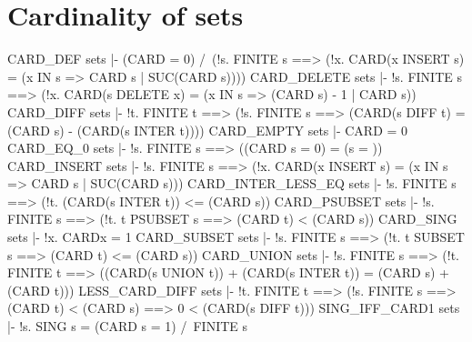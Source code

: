 \section{Cardinality of sets}
\THEOREM CARD\_DEF sets
|- (CARD{} = 0) /\
   (!s.
     FINITE s ==>
     (!x. CARD(x INSERT s) = (x IN s => CARD s | SUC(CARD s))))
\ENDTHEOREM
\THEOREM CARD\_DELETE sets
|- !s.
    FINITE s ==>
    (!x. CARD(s DELETE x) = (x IN s => (CARD s) - 1 | CARD s))
\ENDTHEOREM
\THEOREM CARD\_DIFF sets
|- !t.
    FINITE t ==>
    (!s. FINITE s ==> (CARD(s DIFF t) = (CARD s) - (CARD(s INTER t))))
\ENDTHEOREM
\THEOREM CARD\_EMPTY sets
|- CARD{} = 0
\ENDTHEOREM
\THEOREM CARD\_EQ\_0 sets
|- !s. FINITE s ==> ((CARD s = 0) = (s = {}))
\ENDTHEOREM
\THEOREM CARD\_INSERT sets
|- !s.
    FINITE s ==>
    (!x. CARD(x INSERT s) = (x IN s => CARD s | SUC(CARD s)))
\ENDTHEOREM
\THEOREM CARD\_INTER\_LESS\_EQ sets
|- !s. FINITE s ==> (!t. (CARD(s INTER t)) <= (CARD s))
\ENDTHEOREM
\THEOREM CARD\_PSUBSET sets
|- !s. FINITE s ==> (!t. t PSUBSET s ==> (CARD t) < (CARD s))
\ENDTHEOREM
\THEOREM CARD\_SING sets
|- !x. CARD{x} = 1
\ENDTHEOREM
\THEOREM CARD\_SUBSET sets
|- !s. FINITE s ==> (!t. t SUBSET s ==> (CARD t) <= (CARD s))
\ENDTHEOREM
\THEOREM CARD\_UNION sets
|- !s.
    FINITE s ==>
    (!t.
      FINITE t ==>
      ((CARD(s UNION t)) + (CARD(s INTER t)) = (CARD s) + (CARD t)))
\ENDTHEOREM
\THEOREM LESS\_CARD\_DIFF sets
|- !t.
    FINITE t ==>
    (!s. FINITE s ==> (CARD t) < (CARD s) ==> 0 < (CARD(s DIFF t)))
\ENDTHEOREM
\THEOREM SING\_IFF\_CARD1 sets
|- !s. SING s = (CARD s = 1) /\ FINITE s
\ENDTHEOREM
